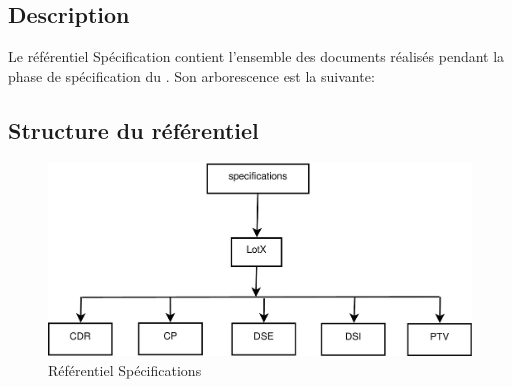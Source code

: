 \subsection{Description}

Le référentiel Spécification contient l’ensemble des documents réalisés pendant la phase de spécification du \PICCourt. Son arborescence est la suivante:

\subsection{Structure du référentiel}

\begin{figure}[ht]

         \begin{center}

         \includegraphics[scale=0.52]{images/arboSpecifications}

         \end{center}

         \caption{Référentiel Spécifications}
 \end{figure}
